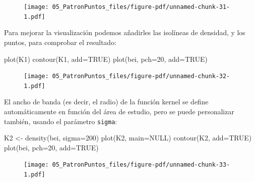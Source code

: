 \documentclass[
  letterpaper,
  DIV=11,
  numbers=noendperiod]{scrreprt}
\newenvironment{Shaded}{\begin{snugshade}}{\end{snugshade}}
\newcommand{\AttributeTok}[1]{\textcolor[rgb]{0.40,0.45,0.13}{#1}}
\newcommand{\ConstantTok}[1]{\textcolor[rgb]{0.56,0.35,0.01}{#1}}
\newcommand{\DecValTok}[1]{\textcolor[rgb]{0.68,0.00,0.00}{#1}}
\newcommand{\FunctionTok}[1]{\textcolor[rgb]{0.28,0.35,0.67}{#1}}
\newcommand{\NormalTok}[1]{\textcolor[rgb]{0.00,0.23,0.31}{#1}}
\newcommand{\OtherTok}[1]{\textcolor[rgb]{0.00,0.23,0.31}{#1}}
\begin{document}
\begin{figure}[H]

{\centering \texttt{[image: 05\_PatronPuntos\_files/figure-pdf/unnamed-chunk-31-1.pdf]}

}

\end{figure}

Para mejorar la visualización podemos añadirles las isolíneas de
densidad, y los puntos, para comprobar el resultado:

\begin{Shaded}
\begin{Highlighting}[]
\FunctionTok{plot}\NormalTok{(K1)}
\FunctionTok{contour}\NormalTok{(K1, }\AttributeTok{add=}\ConstantTok{TRUE}\NormalTok{)}
\FunctionTok{plot}\NormalTok{(bei, }\AttributeTok{pch=}\DecValTok{20}\NormalTok{, }\AttributeTok{add=}\ConstantTok{TRUE}\NormalTok{)}
\end{Highlighting}
\end{Shaded}

\begin{figure}[H]

{\centering \texttt{[image: 05\_PatronPuntos\_files/figure-pdf/unnamed-chunk-32-1.pdf]}

}

\end{figure}

El ancho de banda (es decir, el radio) de la función kernel se define
automáticamente en función del área de estudio, pero se puede
personalizar también, usando el parámetro \texttt{sigma}:

\begin{Shaded}
\begin{Highlighting}[]
\NormalTok{K2 }\OtherTok{\textless{}{-}} \FunctionTok{density}\NormalTok{(bei, }\AttributeTok{sigma=}\DecValTok{200}\NormalTok{) }
\FunctionTok{plot}\NormalTok{(K2, }\AttributeTok{main=}\ConstantTok{NULL}\NormalTok{)}
\FunctionTok{contour}\NormalTok{(K2, }\AttributeTok{add=}\ConstantTok{TRUE}\NormalTok{)}
\FunctionTok{plot}\NormalTok{(bei, }\AttributeTok{pch=}\DecValTok{20}\NormalTok{, }\AttributeTok{add=}\ConstantTok{TRUE}\NormalTok{)}
\end{Highlighting}
\end{Shaded}

\begin{figure}[H]

{\centering \texttt{[image: 05\_PatronPuntos\_files/figure-pdf/unnamed-chunk-33-1.pdf]}

}

\end{figure}
\end{document}

